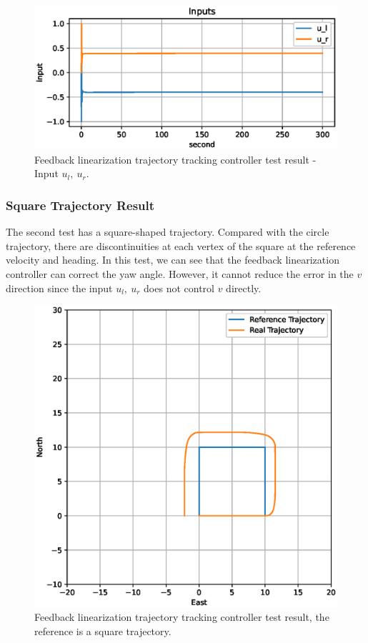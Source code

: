 \begin{figure}[H]
    \centering
    \includegraphics[width=.8\textwidth]{images/05fl-result-circle-u.eps}
    \caption{Feedback linearization trajectory tracking controller test result - Input $u_l,\ u_r$.}
    \label{fig:05fl-result-circle-u}
\end{figure}

\subsubsection{Square Trajectory Result}

The second test has a square-shaped trajectory. Compared with the circle trajectory, there are discontinuities at each vertex of the square at the reference velocity and heading. In this test, we can see that the feedback linearization controller can correct the yaw angle. However, it cannot reduce the error in the $v$ direction since the input $u_l,\ u_r$ does not control $v$ directly.

\begin{figure}[H]
    \centering
    \includegraphics[width=.5\textwidth]{images/05fl-result-square.eps}
    \caption{Feedback linearization trajectory tracking controller test result, the reference is a square trajectory.}
    \label{fig:05fl-result-square}
\end{figure}

